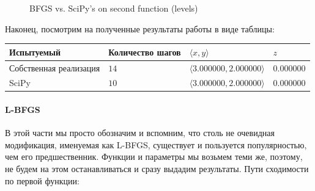\documentclass[12pt, a4paper, oneside, final]{article}
\begin{document}
\begin{figure}[H]
		\caption*{BFGS vs. SciPy's on second function (levels)}
	\end{figure}
	Наконец, посмотрим на полученные результаты работы в виде таблицы:
	\begin{table}[H]
		\centering
		\begin{tabular}{l|l|l|l}
			Испытуемый & Количество шагов & $\langle x, y \rangle$ & $z$ \\ \hline
			Собственная реализация & $14$ & $\langle 3.000000, 2.000000 \rangle$ & $0.000000$ \\
			SciPy & $10$ & $\langle 3.000000, 2.000000 \rangle$ & $0.000000$
		\end{tabular}
	\end{table}
	\paragraph{L-BFGS}
	В этой части мы просто обозначим и вспомним, что столь не очевидная модификация, именуемая как L-BFGS, существует и пользуется популярностью, чем его предшественник.
	Функции и параметры мы возьмем теми же, поэтому, не будем на этом останавливаться и сразу выдадим результаты.
	Пути сходимости по первой функции:
\end{document}
